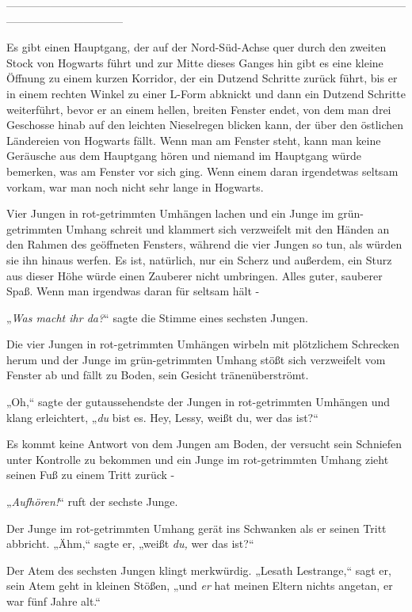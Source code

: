 {--------------------------------------------------------------------------------------------------------------------------------------------

\hfill\break Es gibt einen Hauptgang, der auf der Nord-Süd-Achse quer durch den zweiten Stock von Hogwarts führt und zur Mitte dieses Ganges hin gibt es eine kleine Öffnung zu einem kurzen Korridor, der ein Dutzend Schritte zurück führt, bis er in einem rechten Winkel zu einer L-Form abknickt und dann ein Dutzend Schritte weiterführt, bevor er an einem hellen, breiten Fenster endet, von dem man drei Geschosse hinab auf den leichten Nieselregen blicken kann, der über den östlichen Ländereien von Hogwarts fällt. Wenn man am Fenster steht, kann man keine Geräusche aus dem Hauptgang hören und niemand im Hauptgang würde bemerken, was am Fenster vor sich ging. Wenn einem daran irgendetwas seltsam vorkam, war man noch nicht sehr lange in Hogwarts.

Vier Jungen in rot-getrimmten Umhängen lachen und ein Junge im grün-getrimmten Umhang schreit und klammert sich verzweifelt mit den Händen an den Rahmen des geöffneten Fensters, während die vier Jungen so tun, als würden sie ihn hinaus werfen. Es ist, natürlich, nur ein Scherz und außerdem, ein Sturz aus dieser Höhe würde einen Zauberer nicht umbringen. Alles guter, sauberer Spaß. Wenn man irgendwas daran für seltsam hält -

„\emph{Was macht ihr da?}“ sagte die Stimme eines sechsten Jungen.

Die vier Jungen in rot-getrimmten Umhängen wirbeln mit plötzlichem Schrecken herum und der Junge im grün-getrimmten Umhang stößt sich verzweifelt vom Fenster ab und fällt zu Boden, sein Gesicht tränenüberströmt.

„Oh,“ sagte der gutaussehendste der Jungen in rot-getrimmten Umhängen und klang erleichtert, „\emph{du} bist es. Hey, Lessy, weißt du, wer das ist?“

Es kommt keine Antwort von dem Jungen am Boden, der versucht sein Schniefen unter Kontrolle zu bekommen und ein Junge im rot-getrimmten Umhang zieht seinen Fuß zu einem Tritt zurück -

„\emph{Aufhören!}“ ruft der sechste Junge.

Der Junge im rot-getrimmten Umhang gerät ins Schwanken als er seinen Tritt abbricht. „Ähm,“ sagte er, „weißt \emph{du,} wer das ist?“

Der Atem des sechsten Jungen klingt merkwürdig. „Lesath Lestrange,“ sagt er, sein Atem geht in kleinen Stößen, „und \emph{er} hat meinen Eltern nichts angetan, er war fünf Jahre alt.“

}
